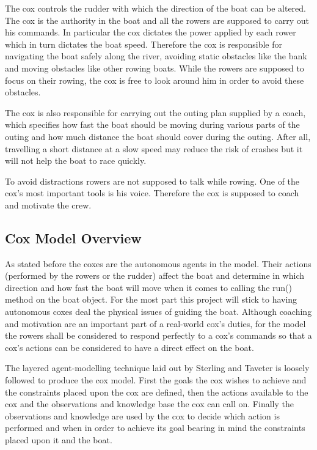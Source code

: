       The cox controls the rudder with which the direction of the boat can be altered. The cox is the authority in the boat and all the rowers are supposed to carry out his commands. In particular the cox dictates the power applied by each rower which in turn dictates the boat speed. Therefore the cox is responsible for navigating the boat safely along the river, avoiding static obstacles like the bank and moving obstacles like other rowing boats. While the rowers are supposed to focus on their rowing, the cox is free to look around him in order to avoid these obstacles. 
      
      The cox is also responsible for carrying out the outing plan supplied by a coach, which specifies how fast the boat should be moving during various parts of the outing and how much distance the boat should cover during the outing. After all, travelling a short distance at a slow speed may reduce the risk of crashes but it will not help the boat to race quickly.
      
      To avoid distractions rowers are not supposed to talk while rowing. One of the cox's most important tools is his voice. Therefore the cox is supposed to coach and motivate the crew.
      
      \subsection{Cox Model Overview}
      As stated before the coxes are the autonomous agents in the model. Their actions (performed by the rowers or the rudder) affect the boat and determine in which direction and how fast the boat will move when it comes to calling the run() method on the boat object. For the most part this project will stick to having autonomous coxes deal the physical issues of guiding the boat. Although coaching and motivation are an important part of a real-world cox's duties, for the model the rowers shall be considered to respond perfectly to a cox's commands so that a cox's actions can be considered to have a direct effect on the boat.
      
      The layered agent-modelling technique laid out by Sterling and Taveter \cite{Sterling2009} is loosely followed to produce the cox model. First the goals the cox wishes to achieve and the constraints placed upon the cox are defined, then the actions available to the cox and the observations and knowledge base the cox can call on. Finally the observations and knowledge are used by the cox to decide which action is performed and when in order to achieve its goal bearing in mind the constraints placed upon it and the boat.

